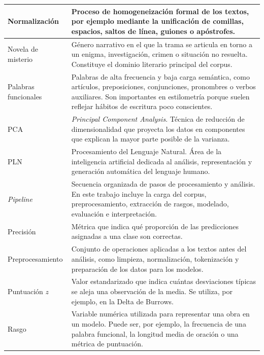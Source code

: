 \documentclass[IB]{TFUOC}%
\begin{document}
\begin{longtable}{|p{5.2cm}|p{10.5cm}|}
Normalización &
Proceso de homogeneización formal de los textos, por ejemplo mediante la unificación de comillas, espacios, saltos de línea, guiones o apóstrofes. \\
\hline

Novela de misterio &
Género narrativo en el que la trama se articula en torno a un enigma, investigación, crimen o situación no resuelta. Constituye el dominio literario principal del corpus. \\
\hline

Palabras funcionales &
Palabras de alta frecuencia y baja carga semántica, como artículos, preposiciones, conjunciones, pronombres o verbos auxiliares. Son importantes en estilometría porque suelen reflejar hábitos de escritura poco conscientes. \\
\hline

PCA &
\textit{Principal Component Analysis}. Técnica de reducción de dimensionalidad que proyecta los datos en componentes que explican la mayor parte posible de la varianza. \\
\hline

PLN &
Procesamiento del Lenguaje Natural. Área de la inteligencia artificial dedicada al análisis, representación y generación automática del lenguaje humano. \\
\hline

\textit{Pipeline} &
Secuencia organizada de pasos de procesamiento y análisis. En este trabajo incluye la carga del corpus, preprocesamiento, extracción de rasgos, modelado, evaluación e interpretación. \\
\hline

Precisión &
Métrica que indica qué proporción de las predicciones asignadas a una clase son correctas. \\
\hline

Preprocesamiento &
Conjunto de operaciones aplicadas a los textos antes del análisis, como limpieza, normalización, tokenización y preparación de los datos para los modelos. \\
\hline

Puntuación $z$ &
Valor estandarizado que indica cuántas desviaciones típicas se aleja una observación de la media. Se utiliza, por ejemplo, en la Delta de Burrows. \\
\hline

Rasgo &
Variable numérica utilizada para representar una obra en un modelo. Puede ser, por ejemplo, la frecuencia de una palabra funcional, la longitud media de oración o una métrica de puntuación. \\
\hline


\end{longtable}
\end{document}
